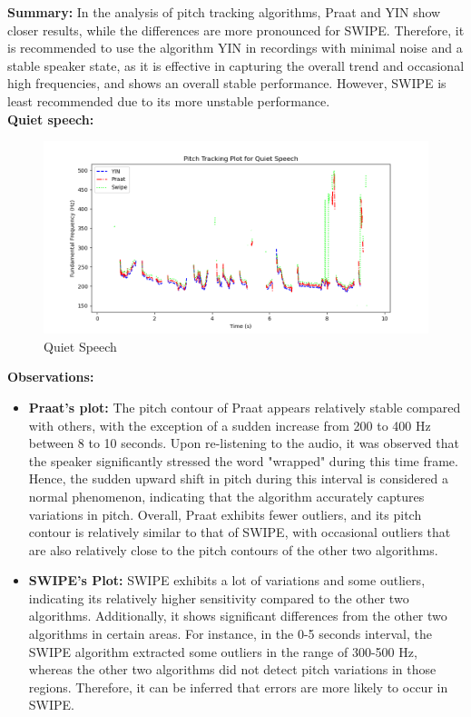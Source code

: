 \documentclass{../labbook}
\begin{document}
\begin{solution}
\textbf{Summary:} In the analysis of pitch tracking algorithms, Praat and YIN show closer results, while the differences are more pronounced for SWIPE. Therefore, it is recommended to use the algorithm YIN in recordings with minimal noise and a stable speaker state, as it is effective in capturing the overall trend and occasional high frequencies, and shows an overall stable performance. However, SWIPE is least recommended due to its more unstable performance.\\

\textbf{Quiet speech:}
\begin{figure}[h]
    \centering
    \includegraphics[width=0.8\linewidth]{recording2_quiet_fm_pitch_plot.png}
    \caption{Quiet Speech}
    \label{Quiet Speech}
\end{figure}

\textbf{Observations:}
\begin{itemize}
    \item \textbf{Praat's plot:} The pitch contour of Praat appears relatively stable compared with others, with the exception of a sudden increase from 200 to 400 Hz between 8 to 10 seconds. Upon re-listening to the audio, it was observed that the speaker significantly stressed the word "wrapped" during this time frame. Hence, the sudden upward shift in pitch during this interval is considered a normal phenomenon, indicating that the algorithm accurately captures variations in pitch. Overall, Praat exhibits fewer outliers, and its pitch contour is relatively similar to that of SWIPE, with occasional outliers that are also relatively close to the pitch contours of the other two algorithms.


    \item \textbf{SWIPE's Plot:} SWIPE exhibits a lot of variations and some outliers, indicating its relatively higher sensitivity compared to the other two algorithms. Additionally, it shows significant differences from the other two algorithms in certain areas. For instance, in the 0-5 seconds interval, the SWIPE algorithm extracted some outliers in the range of 300-500 Hz, whereas the other two algorithms did not detect pitch variations in those regions. Therefore, it can be inferred that errors are more likely to occur in SWIPE.



\end{itemize}
\end{solution}
\end{document}

